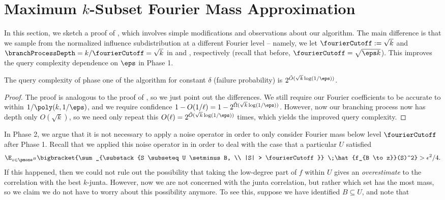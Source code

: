 \section{Maximum $k$-Subset Fourier Mass Approximation}
\label{appendix:k-mass-estimation}
In this section, we sketch a proof of , which involves simple modifications and observations about our algorithm. The main difference is that we sample from the normalized influence subdistribution at a different Fourier level --  namely, we let $\fourierCutoff := \sqrt{k}$ and $\branchProcessDepth = k/\fourierCutoff = \sqrt{k}$ in  and , respectively (recall that before, $\fourierCutoff = \sqrt{\eps k}$). This improves the query complexity dependence on $\eps$ in Phase 1.
\begin{claim}
\label{claim:phase-one-mass-query-complexity}
The query complexity of phase one of the algorithm for constant $\delta$ (failure probability) is $2^{\tilde{O}(\sqrt{k}\log(1/\eps))}$.
\end{claim}
\begin{proof}
The proof is analogous to the proof of , so we just point out the differences. We still require our Fourier coefficients to be accurate to within $1/\poly(k,1/\eps)$, and we require confidence $1-O(1/\ell) =1 - 2^{\Tilde{\Omega}(\sqrt{k}\log(1/\eps))}$. However, now our branching process now has depth only $O(\sqrt{k})$, so we need only repeat this $O(\ell) = 2^{\tilde{O}(\sqrt{k}\log(1/\eps))}$ times, which yields the improved query complexity.
\end{proof}
In Phase 2, we argue that it is not necessary to apply a noise operator in order to only consider Fourier mass below level $\fourierCutoff$ after Phase 1. Recall that we applied this noise operator in  in order to deal with the case that a particular $U$ satisfied
\begin{equation}\label{eq:U conc appendix}
\E_{z\in \pmone^{B}}\bigbracket{\sum_{\substack{S \subseteq U \setminus B, \\ |S| > \fourierCutoff}} \;\hat{f_{B \to z}}(S)^2} >\epsilon^2/4.
\end{equation}
If this happened, then we could not rule out the possibility that taking the low-degree part of $f$ within $U$ gives an \textit{overestimate} to the correlation with the best $k$-junta. However, now we are not concerned with the junta correlation, but rather which set has the most mass, so we claim we do not have to worry about this possibility anymore. To see this, suppose we have identified $B \subseteq U$, and note that
